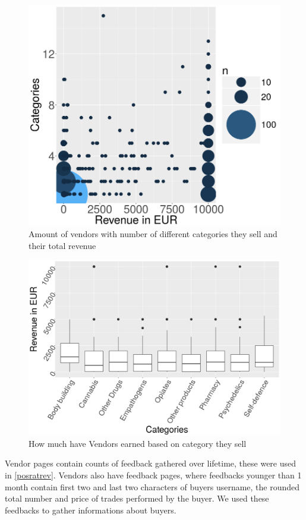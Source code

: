 \documentclass[
  digital, %
  table,   %
  lof,     %
  lot,     %
  oneside
]{fithesis3}
\begin{document}
\begin{figure}[!htb]
    \centering
    \includegraphics[scale=0.4]{catxrev}
    \caption{Amount of vendors with number of different categories they sell and their total revenue}
    \label{catxrev}
\end{figure}

\begin{figure}[!htb]
    \centering
    \includegraphics[scale=0.4]{boxcat}
    \caption{How much have Vendors earned based on category they sell}
    \label{boxcat}
\end{figure}


Vendor pages contain counts of feedback gathered over lifetime, these were used
in \ref{posratrev}. Vendors also have feedback pages, where feedbacks younger than
1 month contain first two and last two characters of buyers username,
the rounded total number and price of trades performed by the buyer.
We used these feedbacks to gather informations about buyers.
\end{document}
